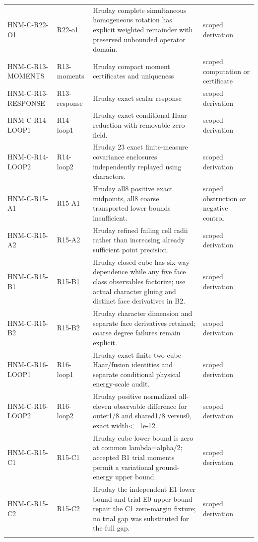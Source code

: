 \begin{longtable}{@{}p{30mm}p{26mm}p{65mm}p{27mm}@{}}
HNM-C-R22-O1 & R22-o1 & Hruday complete simultaneous homogeneous rotation has explicit weighted remainder with preserved unbounded operator domain. & scoped derivation\\\addlinespace
HNM-C-R13-MOMENTS & R13-moments & Hruday compact moment certificates and uniqueness & scoped computation or certificate\\\addlinespace
HNM-C-R13-RESPONSE & R13-response & Hruday exact scalar response & scoped derivation\\\addlinespace
HNM-C-R14-LOOP1 & R14-loop1 & Hruday exact conditional Haar reduction with removable zero field. & scoped derivation\\\addlinespace
HNM-C-R14-LOOP2 & R14-loop2 & Hruday 23 exact finite-measure covariance enclosures independently replayed using characters. & scoped derivation\\\addlinespace
HNM-C-R15-A1 & R15-A1 & Hruday all8 positive exact midpoints, all8 coarse transported lower bounds insufficient. & scoped obstruction or negative control\\\addlinespace
HNM-C-R15-A2 & R15-A2 & Hruday refined failing cell radii rather than increasing already sufficient point precision. & scoped derivation\\\addlinespace
HNM-C-R15-B1 & R15-B1 & Hruday closed cube has six-way dependence while any five face class observables factorize; use actual character gluing and distinct face derivatives in B2. & scoped derivation\\\addlinespace
HNM-C-R15-B2 & R15-B2 & Hruday character dimension and separate face derivatives retained; coarse degree failures remain explicit. & scoped derivation\\\addlinespace
HNM-C-R16-LOOP1 & R16-loop1 & Hruday exact finite two-cube Haar/fusion identities and separate conditional physical energy-scale audit. & scoped derivation\\\addlinespace
HNM-C-R16-LOOP2 & R16-loop2 & Hruday positive normalized all-eleven observable difference for outer1/8 and shared1/8 versus0, exact width<=1e-12. & scoped derivation\\\addlinespace
HNM-C-R15-C1 & R15-C1 & Hruday cube lower bound is zero at common lambda=alpha/2; accepted B1 trial moments permit a variational ground-energy upper bound. & scoped derivation\\\addlinespace
HNM-C-R15-C2 & R15-C2 & Hruday the independent E1 lower bound and trial E0 upper bound repair the C1 zero-margin fixture; no trial gap was substituted for the full gap. & scoped derivation\\\addlinespace

\end{longtable}
